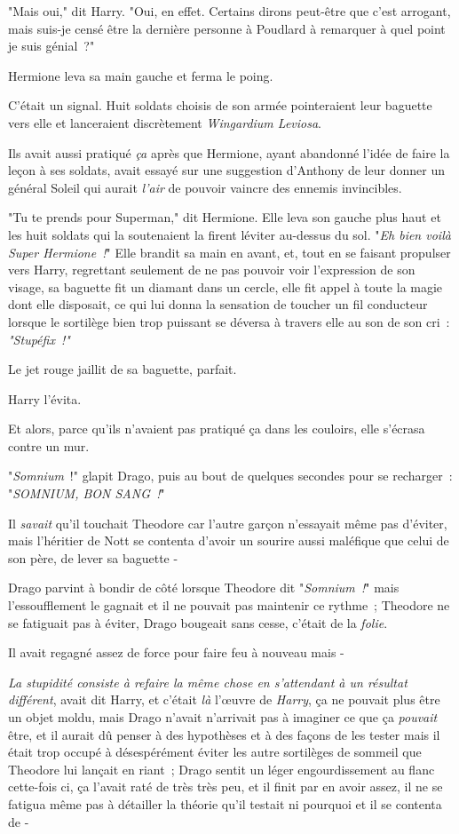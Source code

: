 "Mais oui," dit Harry. "Oui, en effet. Certains dirons peut-être que c'est arrogant, mais suis-je censé être la dernière personne à Poudlard à remarquer à quel point je suis génial~?"

Hermione leva sa main gauche et ferma le poing.

C'était un signal. Huit soldats choisis de son armée pointeraient leur baguette vers elle et lanceraient discrètement \emph{Wingardium Leviosa}.

Ils avait aussi pratiqué \emph{ça} après que Hermione, ayant abandonné l'idée de faire la leçon à ses soldats, avait essayé sur une suggestion d'Anthony de leur donner un général Soleil qui aurait \emph{l'air} de pouvoir vaincre des ennemis invincibles.

"Tu te prends pour Superman," dit Hermione. Elle leva son gauche plus haut et les huit soldats qui la soutenaient la firent léviter au-dessus du sol. "\emph{Eh bien voilà Super Hermione~!}" Elle brandit sa main en avant, et, tout en se faisant propulser vers Harry, regrettant seulement de ne pas pouvoir voir l'expression de son visage, sa baguette fit un diamant dans un cercle, elle fit appel à toute la magie dont elle disposait, ce qui lui donna la sensation de toucher un fil conducteur lorsque le sortilège bien trop puissant se déversa à travers elle au son de son cri~: \emph{"Stupéfix~!"}

Le jet rouge jaillit de sa baguette, parfait.

Harry l'évita.

Et alors, parce qu'ils n'avaient pas pratiqué ça dans les couloirs, elle s'écrasa contre un mur.

\later

"\emph{Somnium}~!" glapit Drago, puis au bout de quelques secondes pour se recharger~: "\emph{SOMNIUM, BON SANG~!}"

Il \emph{savait} qu'il touchait Theodore car l'autre garçon n'essayait même pas d'éviter, mais l'héritier de Nott se contenta d'avoir un sourire aussi maléfique que celui de son père, de lever sa baguette -

Drago parvint à bondir de côté lorsque Theodore dit "\emph{Somnium~!}" mais l'essoufflement le gagnait et il ne pouvait pas maintenir ce rythme~; Theodore ne se fatiguait pas à éviter, Drago bougeait sans cesse, c'était de la \emph{folie}.

Il avait regagné assez de force pour faire feu à nouveau mais -

\emph{La stupidité consiste à refaire la même chose en s'attendant à un résultat différent}, avait dit Harry, et c'était \emph{là} l'œuvre de \emph{Harry}, ça ne pouvait plus être un objet moldu, mais Drago n'avait n'arrivait pas à imaginer ce que ça \emph{pouvait} être, et il aurait dû penser à des hypothèses et à des façons de les tester mais il était trop occupé à désespérément éviter les autre sortilèges de sommeil que Theodore lui lançait en riant~; Drago sentit un léger engourdissement au flanc cette-fois ci, ça l'avait raté de très très peu, et il finit par en avoir assez, il ne se fatigua même pas à détailler la théorie qu'il testait ni pourquoi et il se contenta de -


